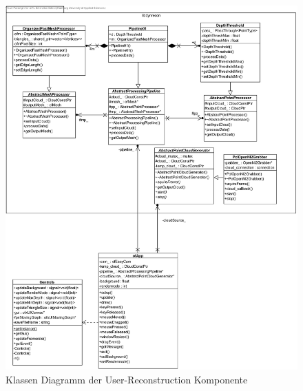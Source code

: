 \onecolumn

\begin{figure}[h]
	\begin{center}		
		\includegraphics[width=\textwidth, keepaspectratio]{img/class_diagram}
		\caption{Klassen Diagramm der User-Reconstruction Komponente}
		\label{fig:classdiag}
	\end{center}
\end{figure}

\twocolumn
